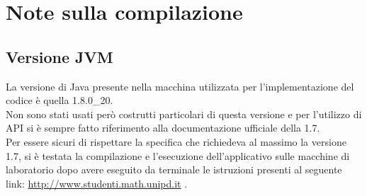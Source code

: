 % 
%
%

\section{Note sulla compilazione} %
\label{sec:note_sulla_compilazione}
	\subsection{Versione JVM}
	La versione di Java presente nella macchina utilizzata per l'implementazione del codice è quella 1.8.0\_20. \\
	Non sono stati usati però costrutti particolari di questa versione e per l'utilizzo di API si è sempre fatto riferimento alla documentazione ufficiale della 1.7. \\
	Per essere sicuri di rispettare la specifica che richiedeva al massimo la versione 1.7, si è testata la compilazione e l'esecuzione dell'applicativo sulle macchine di laboratorio dopo avere eseguito da terminale le istruzioni presenti al seguente link: \href{http://www.studenti.math.unipd.it/index.php?id=corsi#c620}{http://www.studenti.math.unipd.it} .

